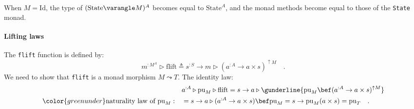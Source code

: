When $M=\text{Id}$, the type of $(\text{State}\varangle M)^{A}$
becomes equal to $\text{State}^{A}$, and the monad methods become
equal to those of the \lstinline!State! monad.

\paragraph{Lifting laws}

The \lstinline!flift! function is defined by:
\begin{equation}
m^{:M^{A}}\triangleright\text{flift}\triangleq s^{:S}\rightarrow m\triangleright(a^{:A}\rightarrow a\times s)^{\uparrow M}\quad.\label{eq:state-transformer-def-of-flift}
\end{equation}
We need to show that \lstinline!flift! is a monad morphism $M\leadsto T$.
The identity law:
\begin{align*}
 & a^{:A}\triangleright\text{pu}_{M}\triangleright\text{flift}=s\rightarrow a\triangleright\gunderline{\text{pu}_{M}\bef(a^{:A}\rightarrow a\times s)^{\uparrow M}}\\
{\color{greenunder}\text{naturality law of }\text{pu}_{M}:}\quad & =s\rightarrow a\triangleright(a^{:A}\rightarrow a\times s)\bef\text{pu}_{M}=s\rightarrow\text{pu}_{M}(a\times s)=\text{pu}_{T}\quad.
\end{align*}

